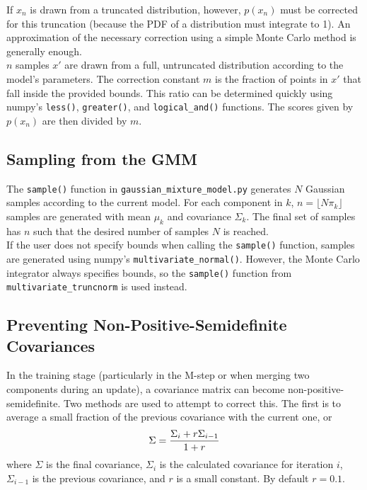 \documentclass{article}
\begin{document}
If $x_n$ is drawn from a truncated distribution, however, $p(x_n)$ must be corrected
for this truncation (because the PDF of a distribution must integrate to 1).
An approximation of the necessary correction using a simple Monte Carlo method is
generally enough. \\

$n$ samples $x'$ are drawn from a full, untruncated distribution
according to the model's parameters. The correction constant $m$ is the
fraction of points in $x'$ that fall inside the provided bounds. This ratio can
be determined quickly using numpy's \texttt{less()}, \texttt{greater()}, and
\texttt{logical\_and()} functions. The scores given by $p(x_n)$ are then divided
by $m$.

\subsection{Sampling from the GMM}

The \texttt{sample()} function in \texttt{gaussian\_mixture\_model.py} generates
$N$ Gaussian samples according to the current model. For each component in $k$,
$n = \lfloor N\pi_k \rfloor$ samples are generated with mean $\mu_k$ and
covariance $\Sigma_k$. The final set of samples has $n$ such that the desired
number of samples $N$ is reached. \\

If the user does not specify bounds when calling the \texttt{sample()} function,
samples are generated using numpy's \texttt{multivariate\_normal()}. However,
the Monte Carlo integrator always specifies bounds, so the \texttt{sample()}
function from \texttt{multivariate\_truncnorm} is used instead.

\subsection{Preventing Non-Positive-Semidefinite Covariances}

In the training stage (particularly in the M-step or when merging two components
during an update), a covariance matrix can become non-positive-semidefinite.
Two methods are used to attempt to correct this. The first is to average a small
fraction of the previous covariance with the current one, or
\begin{equation}
    \Sigma = {{\Sigma_{i} + r \Sigma_{i-1}} \over {1 + r}}
\end{equation}
where $\Sigma$ is the final covariance, $\Sigma_i$ is the calculated covariance
for iteration $i$, $\Sigma_{i-1}$ is the previous covariance, and $r$ is a small
constant. By default $r = 0.1$. \\
\end{document}
